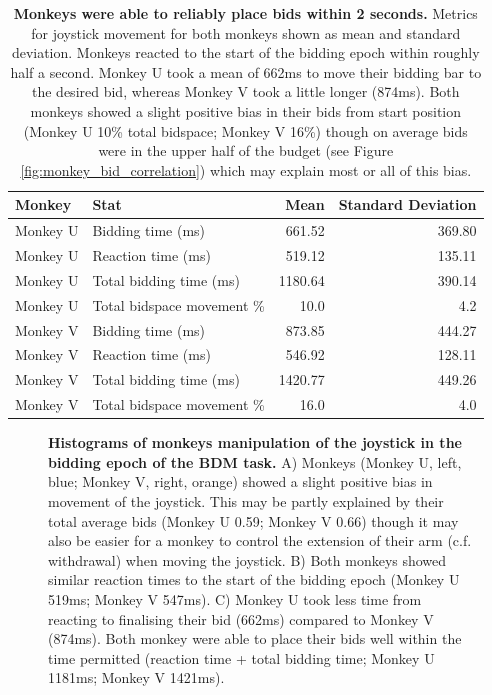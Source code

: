 \begin{table}[htbp]
  \centering
  \begin{tabular}{llrr}
    \toprule
    \textbf{Monkey} & \textbf{Stat} & \textbf{Mean} & \textbf{Standard Deviation} \\
    \midrule
    Monkey U & Bidding time (ms) & 661.52 & 369.80 \\
    Monkey U & Reaction time (ms) & 519.12 & 135.11 \\
    Monkey U & Total bidding time (ms) & 1180.64 & 390.14 \\
    Monkey U & Total bidspace movement \% & 10.0 & 4.2 \\
    \hline
    Monkey V & Bidding time (ms) & 873.85 & 444.27 \\
    Monkey V & Reaction time (ms) & 546.92 & 128.11 \\
    Monkey V & Total bidding time (ms) & 1420.77 & 449.26 \\
    Monkey V & Total bidspace movement \% & 16.0 & 4.0 \\
    \bottomrule
  \end{tabular}
\caption[Monkeys were able to reliably place bids within 2 seconds.]{\textbf{Monkeys were able to reliably place bids within 2 seconds.} Metrics for joystick movement for both monkeys shown as mean and standard deviation. Monkeys reacted to the start of the bidding epoch within roughly half a second. Monkey U took a mean of 662ms to move their bidding bar to the desired bid, whereas Monkey V took a little longer (874ms). Both monkeys showed a slight positive bias in their bids from start position (Monkey U 10\% total bidspace; Monkey V 16\%) though on average bids were in the upper half of the budget (see Figure \ref{fig:monkey_bid_correlation}) which may explain most or all of this bias.}
\label{tab:monkey_movement}
\end{table}

\begin{figure}[htbp!] 
\centering    

\caption[Histograms of monkeys manipulation of the joystick in the bidding epoch of the BDM task.]{\textbf{Histograms of monkeys manipulation of the joystick in the bidding epoch of the BDM task.} A) Monkeys (Monkey U, left, blue; Monkey V, right, orange) showed a slight positive bias in movement of the joystick. This may be partly explained by their total average bids (Monkey U 0.59; Monkey V 0.66) though it may also be easier for a monkey to control the extension of their arm (c.f. withdrawal) when moving the joystick. B) Both monkeys showed similar reaction times to the start of the bidding epoch (Monkey U 519ms; Monkey V 547ms). C) Monkey U took less time from reacting to finalising their bid (662ms) compared to Monkey V (874ms). Both monkey were able to place their bids well within the time permitted (reaction time + total bidding time; Monkey U 1181ms; Monkey V 1421ms).}
\label{fig:monkey_joystick1}
\end{figure}

